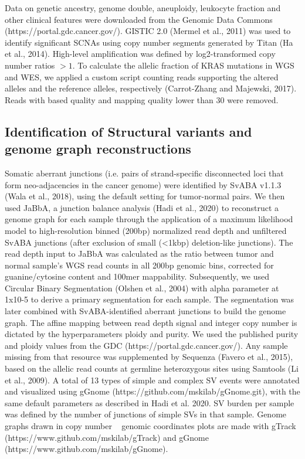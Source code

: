 \documentclass[phd,tocprelim]{cornell}
\begin{document}
Data on genetic ancestry, genome double, aneuploidy, leukocyte fraction and other clinical features were downloaded from the Genomic Data Commons (https://portal.gdc.cancer.gov/). GISTIC 2.0 (Mermel et al., 2011) was used to identify significant SCNAs using copy number segments generated by Titan (Ha et al., 2014). High-level amplification was defined by log2-transformed copy number ratios $>1$. To calculate the allelic fraction of KRAS mutations in WGS and WES, we applied a custom script counting reads supporting the altered alleles and the reference alleles, respectively (Carrot-Zhang and Majewski, 2017). Reads with based quality and mapping quality lower than 30 were removed.

\subsection*{Identification of Structural variants and genome graph reconstructions}
Somatic aberrant junctions (i.e. pairs of strand-specific disconnected loci that form neo-adjacencies in the cancer genome) were identified by SvABA v1.1.3 (Wala et al., 2018), using the default setting for tumor-normal pairs. We then used JaBbA, a junction balance analysis (Hadi et al., 2020) to reconstruct a genome graph for each sample through the application of a maximum likelihood model to high-resolution binned (200bp) normalized read depth and unfiltered SvABA junctions (after exclusion of small (<1kbp) deletion-like junctions). The read depth input to JaBbA was calculated as the ratio between tumor and normal sample’s WGS read counts in all 200bp genomic bins, corrected for guanine/cytosine content and 100mer mappability. Subsequently, we used Circular Binary Segmentation (Olshen et al., 2004) with alpha parameter at 1x10-5 to derive a primary segmentation for each sample. The segmentation was later combined with SvABA-identified aberrant junctions to build the genome graph. The affine mapping between read depth signal and integer copy number is dictated by the hyperparameters ploidy and purity. We used the published purity and ploidy values from the GDC (https://portal.gdc.cancer.gov/). Any sample missing from that resource was supplemented by Sequenza (Favero et al., 2015), based on the allelic read counts at germline heterozygous sites using Samtools (Li et al., 2009). A total of 13 types of simple and complex SV events were annotated and visualized using gGnome (https://github.com/mskilab/gGnome.git), with the same default parameters as described in Hadi et al. 2020. SV burden per sample was defined by the number of junctions of simple SVs in that sample. Genome graphs drawn in copy number ~ genomic coordinates plots are made with gTrack (https://www.github.com/mskilab/gTrack) and gGnome (https://www.github.com/mskilab/gGnome).
\end{document}
